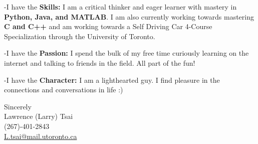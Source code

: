 \documentclass[11pt,a4]{article}
\newcommand{\bold}[1]{ {\bfseries #1}}
\begin{document}
-I have the \bold{Skills:} I am a critical thinker and eager learner with mastery in
\bold{Python, Java, and MATLAB}. I am also currently working towards mastering
\bold{C and C++} and am working towards a Self Driving Car 4-Course Specialization
through the University of Toronto.\par

-I have the \bold{Passion:} I spend the bulk of my free time curiously learning 
on the internet and talking to friends in the field. All part of the fun!\par
-I have the \bold{Character:} I am a lighthearted guy. I find pleasure in the
 connections and conversations in life  :)





\vspace{0.5cm}
\raggedright
Sincerely \\ Lawrence (Larry) Tsai \\ (267)-401-2843 \\ \href{mailto:L.tsai@mail.utoronto.ca}{L.tsai@mail.utoronto.ca}
\end{document}
